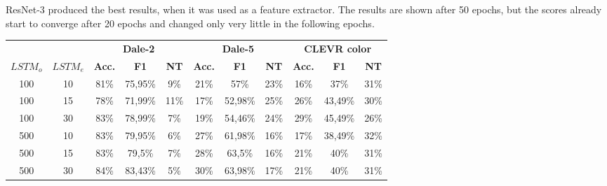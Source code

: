 ResNet-3 produced the best results, when it was used as a feature extractor.
The results are shown after 50 epochs, but the scores already start to converge after 20 epochs and changed only very little in the following epochs.
\begin{table}[ht]
    \centering
    \begin{tabular}{cc|ccc|ccc|ccc}
        \toprule
                 &          & \multicolumn{3}{c}{\textbf{Dale-2}} & \multicolumn{3}{c}{\textbf{Dale-5}} & \multicolumn{3}{c}{\textbf{CLEVR color}}                                                                                         \\  \cmidrule(lr){3-5}\cmidrule(lr){6-8}\cmidrule(lr){9-11}
        $LSTM_o$ & $LSTM_e$ & \textbf{Acc.}                       & \textbf{F1}                         & \textbf{NT}                              & \textbf{Acc.} & \textbf{F1} & \textbf{NT} & \textbf{Acc.} & \textbf{F1} & \textbf{NT} \\\midrule
        {100}    & {10}     & {81\%}                              & {75,95\%}                           & {9\%}                                    & {21\%}        & {57\%}      & {23\%}      & {16\%}        & {37\%}      & {31\%}      \\
        {100}    & {15}     & {78\%}                              & {71,99\%}                           & {11\%}                                   & {17\%}        & {52,98\%}   & {25\%}      & {26\%}        & {43,49\%}   & {30\%}      \\
        {100}    & {30}     & {83\%}                              & {78,99\%}                           & {7\%}                                    & {19\%}        & {54,46\%}   & {24\%}      & {29\%}        & {45,49\%}   & {26\%}      \\
        {500}    & {10}     & {83\%}                              & {79,95\%}                           & {6\%}                                    & {27\%}        & {61,98\%}   & {16\%}      & {17\%}        & {38,49\%}   & {32\%}      \\
        {500}    & {15}     & {83\%}                              & {79,5\%}                            & {7\%}                                    & {28\%}        & {63,5\%}    & {16\%}      & {21\%}        & {40\%}      & {31\%}      \\
        {500}    & {30}     & {84\%}                              & {83,43\%}                           & {5\%}                                    & {30\%}        & {63,98\%}   & {17\%}      & {21\%}        & {40\%}      & {31\%}      \\

\end{tabular}
\end{table}
